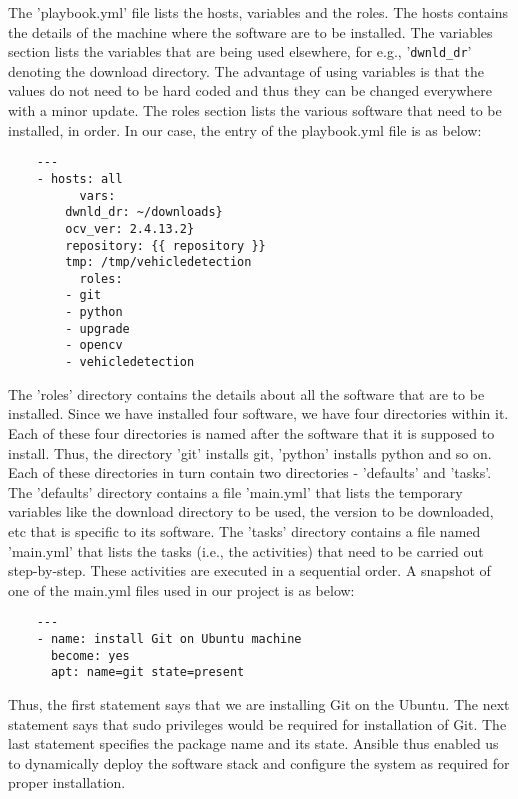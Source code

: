\documentclass[9pt,twocolumn,twoside]{../../styles/osajnl}
\begin{document}
The 'playbook.yml' file lists the hosts, variables and the roles.  The
hosts contains the details of the machine where the software are to
be installed.  The variables section lists the variables that are
being used elsewhere, for e.g., '\texttt{dwnld\_dr}' denoting the download
directory.  The advantage of using variables is that the values do not
need to be hard coded and thus they can be changed everywhere with a
minor update.  The roles section lists the various software that need
to be installed, in order.  In our case, the entry of the playbook.yml
file is as below:

\begin{lstlisting}
	---
	- hosts: all
          vars:
	    dwnld_dr: ~/downloads}
	    ocv_ver: 2.4.13.2}
	    repository: {{ repository }}
	    tmp: /tmp/vehicledetection
          roles:
	    - git
	    - python
	    - upgrade
	    - opencv
	    - vehicledetection
\end{lstlisting}
                
The 'roles' directory contains the details about all the software
that are to be installed.  Since we have installed four software, we
have four directories within it.  Each of these four directories is
named after the software that it is supposed to install.  Thus, the
directory 'git' installs git, 'python' installs python and so on.
Each of these directories in turn contain two directories - 'defaults'
and 'tasks'.  The 'defaults' directory contains a file 'main.yml' that
lists the temporary variables like the download directory to be used,
the version to be downloaded, etc that is specific to its software.
The 'tasks' directory contains a file named 'main.yml' that lists the
tasks (i.e., the activities) that need to be carried out step-by-step.
These activities are executed in a sequential order.  A snapshot of
one of the main.yml files used in our project is as below:

\begin{lstlisting}
	---
	- name: install Git on Ubuntu machine
	  become: yes
	  apt: name=git state=present
\end{lstlisting}

Thus, the first statement says that we are installing Git on the
Ubuntu.  The next statement says that sudo privileges would be
required for installation of Git.  The last statement specifies the
package name and its state.  Ansible thus enabled us to dynamically
deploy the software stack and configure the system as required for
proper installation.
\end{document}
